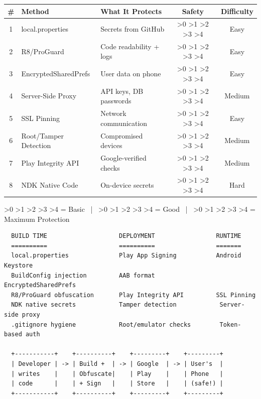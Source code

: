 \documentclass[11pt,a4paper]{article}
\newcommand{\stars}[1]{%
  \ifnum#1>0 \faIcon{star}\fi
  \ifnum#1>1 \faIcon{star}\fi
  \ifnum#1>2 \faIcon{star}\fi
  \ifnum#1>3 \faIcon{star}\fi
  \ifnum#1>4 \faIcon{star}\fi
}
\begin{document}
\begin{summarybox}
\begin{tabularx}{\textwidth}{clXcc}
\toprule
\textbf{\#} & \textbf{Method} & \textbf{What It Protects} & \textbf{Safety} & \textbf{Difficulty} \\
\midrule
1 & local.properties & Secrets from GitHub & \stars{1} & Easy \\
2 & R8/ProGuard & Code readability + logs & \stars{2} & Easy \\
3 & EncryptedSharedPrefs & User data on phone & \stars{4} & Easy \\
4 & Server-Side Proxy & API keys, DB passwords & \stars{5} & Medium \\
5 & SSL Pinning & Network communication & \stars{4} & Easy \\
6 & Root/Tamper Detection & Compromised devices & \stars{3} & Medium \\
7 & Play Integrity API & Google-verified checks & \stars{4} & Medium \\
8 & NDK Native Code & On-device secrets & \stars{3} & Hard \\
\bottomrule
\end{tabularx}

\vspace{8pt}
\stars{1} = Basic ~|~ \stars{3} = Good ~|~ \stars{5} = Maximum Protection
\end{summarybox}

\begin{diagrambox}
\begin{verbatim}
  BUILD TIME                    DEPLOYMENT                 RUNTIME
  ==========                    ==========                 =======
  local.properties              Play App Signing           Android Keystore
  BuildConfig injection         AAB format                 EncryptedSharedPrefs
  R8/ProGuard obfuscation       Play Integrity API         SSL Pinning
  NDK native secrets            Tamper detection            Server-side proxy
  .gitignore hygiene            Root/emulator checks        Token-based auth

  +-----------+    +----------+    +---------+    +---------+
  | Developer | -> | Build +  | -> | Google  | -> | User's  |
  | writes    |    | Obfuscate|    | Play    |    | Phone   |
  | code      |    | + Sign   |    | Store   |    | (safe!) |
  +-----------+    +----------+    +---------+    +---------+
\end{verbatim}
\end{diagrambox}
\end{document}
